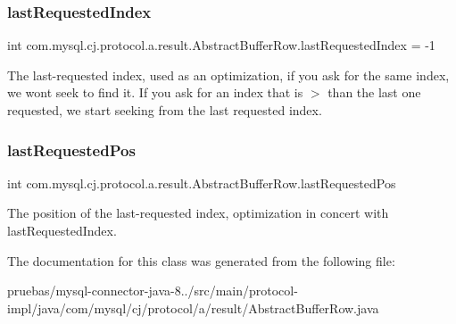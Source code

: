 \subsubsection{\texorpdfstring{last\+Requested\+Index}{lastRequestedIndex}}
{\footnotesize\ttfamily int com.\+mysql.\+cj.\+protocol.\+a.\+result.\+Abstract\+Buffer\+Row.\+last\+Requested\+Index = -\/1\hspace{0.3cm}{\ttfamily [protected]}}

The last-\/requested index, used as an optimization, if you ask for the same index, we won\textquotesingle{}t seek to find it. If you ask for an index that is $>$ than the last one requested, we start seeking from the last requested index. \mbox{\label{classcom_1_1mysql_1_1cj_1_1protocol_1_1a_1_1result_1_1_abstract_buffer_row_a3a7cb8406241de42bddb1ea0db5f0808}} 
\subsubsection{\texorpdfstring{last\+Requested\+Pos}{lastRequestedPos}}
{\footnotesize\ttfamily int com.\+mysql.\+cj.\+protocol.\+a.\+result.\+Abstract\+Buffer\+Row.\+last\+Requested\+Pos\hspace{0.3cm}{\ttfamily [protected]}}

The position of the last-\/requested index, optimization in concert with last\+Requested\+Index. 

The documentation for this class was generated from the following file\+:\begin{DoxyCompactItemize}
\item 
pruebas/mysql-\/connector-\/java-\/8../src/main/protocol-\/impl/java/com/mysql/cj/protocol/a/result/Abstract\+Buffer\+Row.\+java\end{DoxyCompactItemize}
